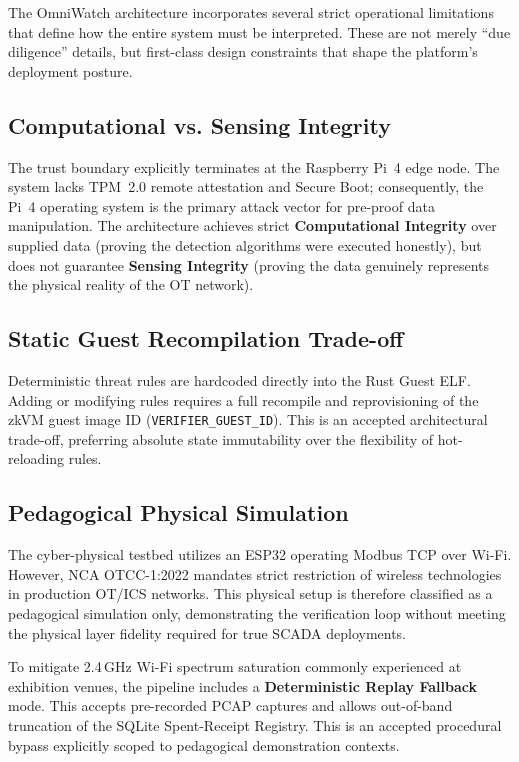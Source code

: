 \documentclass[12pt,a4paper]{article}
\begin{document}
The OmniWatch architecture incorporates several strict operational
limitations that define how the entire system must be interpreted.
These are not merely ``due diligence'' details, but first-class design
constraints that shape the platform's deployment posture.

\subsection{Computational vs. Sensing Integrity}

The trust boundary explicitly terminates at the Raspberry Pi~4 edge node.
The system lacks TPM~2.0 remote attestation and Secure Boot; consequently,
the Pi~4 operating system is the primary attack vector for pre-proof data
manipulation. The architecture achieves strict \textbf{Computational
Integrity} over supplied data (proving the detection algorithms were
executed honestly), but does not guarantee \textbf{Sensing Integrity}
(proving the data genuinely represents the physical reality of the OT network).

\subsection{Static Guest Recompilation Trade-off}

Deterministic threat rules are hardcoded directly into the Rust Guest ELF.
Adding or modifying rules requires a full recompile and reprovisioning
of the zkVM guest image ID (\texttt{VERIFIER\_GUEST\_ID}). This is an accepted
architectural trade-off, preferring absolute state immutability over the
flexibility of hot-reloading rules.

\subsection{Pedagogical Physical Simulation}

The cyber-physical testbed utilizes an ESP32 operating Modbus TCP over Wi-Fi.
However, NCA OTCC-1:2022 mandates strict restriction of wireless technologies
in production OT/ICS networks. This physical setup is therefore classified as
a pedagogical simulation only, demonstrating the verification loop without
meeting the physical layer fidelity required for true SCADA deployments.

To mitigate 2.4\,GHz Wi-Fi spectrum saturation commonly experienced at exhibition venues, the pipeline includes a \textbf{Deterministic Replay Fallback} mode. This accepts pre-recorded PCAP captures and allows out-of-band truncation of the SQLite Spent-Receipt Registry. This is an accepted procedural bypass explicitly scoped to pedagogical demonstration contexts.
\end{document}
